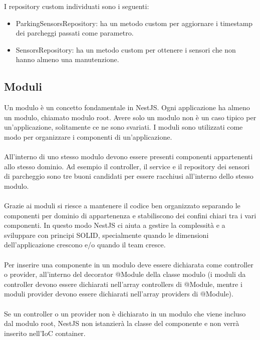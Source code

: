 \leavevmode\newline
I repository custom individuati sono i seguenti:
\begin{itemize}
    \item ParkingSensorsRepository: ha un metodo custom per aggiornare i timestamp dei parcheggi passati come parametro.
    \item SensorsRepository: ha un metodo custom per ottenere i sensori che non hanno almeno una manutenzione.
\end{itemize}

\subsection{Moduli}
Un modulo è un concetto fondamentale in NestJS. Ogni applicazione ha almeno un modulo, chiamato modulo root. 
Avere solo un modulo non è un caso tipico per un'applicazione, solitamente ce ne sono svariati.
I moduli sono utilizzati come modo per organizzare i componenti di un'applicazione.
\\\\
All'interno di uno stesso modulo devono essere presenti componenti appartenenti allo stesso dominio. Ad esempio
il controller, il service e il repository dei sensori di parcheggio sono tre buoni candidati per essere racchiusi 
all'interno dello stesso modulo.
\\\\
Grazie ai moduli si riesce a mantenere il codice ben organizzato separando le componenti per dominio di appartenenza
e stabiliscono dei confini chiari tra i vari componenti. In questo modo NestJS ci aiuta a gestire la complessità e a 
sviluppare con principi SOLID, specialmente quando le dimensioni dell'applicazione crescono e/o quando il team cresce.
\\\\
Per inserire una componente in un modulo deve essere dichiarata come controller o provider, all'interno del decorator
@Module della classe modulo (i moduli da controller devono essere dichiarati nell'array controllers di @Module,
mentre i moduli provider devono essere dichiarati nell'array providers di @Module). 
\\\\
Se un controller o un provider non è dichiarato in un modulo che viene incluso dal modulo
root, NestJS non istanzierà la classe del componente e non verrà inserito nell'IoC container.
\\\\
